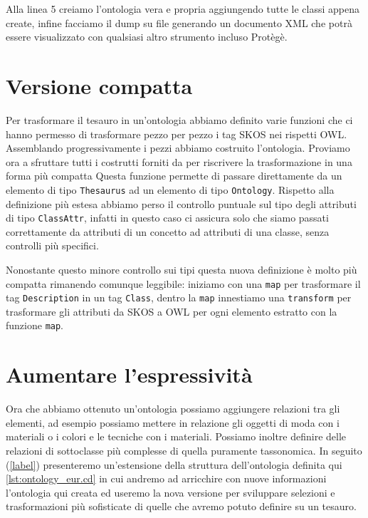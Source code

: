Alla linea 5 creiamo l'ontologia vera e propria aggiungendo tutte le classi appena create, infine facciamo il dump su file generando un documento XML che potrà essere visualizzato con qualsiasi altro strumento incluso Protègè.
\section{Versione compatta}
Per trasformare il tesauro in un'ontologia abbiamo definito varie funzioni che ci hanno permesso di trasformare pezzo per pezzo i tag SKOS nei rispetti OWL. Assemblando progressivamente i pezzi abbiamo costruito l'ontologia. Proviamo ora a sfruttare tutti i costrutti forniti da \cduce per riscrivere la trasformazione in una forma più compatta
Questa funzione permette di passare direttamente da un elemento di tipo \verb|Thesaurus| ad un elemento di tipo \verb|Ontology|. Rispetto alla definizione più estesa abbiamo perso il controllo puntuale sul tipo degli attributi di tipo \verb|ClassAttr|, infatti in questo caso \cduce ci assicura solo che siamo passati correttamente da attributi di un concetto ad attributi di una classe, senza controlli più specifici.

Nonostante questo minore controllo sui tipi questa nuova definizione è molto più compatta rimanendo comunque leggibile: iniziamo con una \verb|map| per trasformare il tag \verb|Description| in un tag \verb|Class|, dentro la \verb|map| innestiamo una \verb|transform| per trasformare gli attributi da SKOS a OWL per ogni elemento estratto con la funzione \verb|map|.

\section{Aumentare l'espressività}\label{expr}
Ora che abbiamo ottenuto un'ontologia possiamo aggiungere relazioni tra gli elementi, ad esempio possiamo mettere in relazione gli oggetti di moda con i materiali o i colori e le tecniche con i materiali. Possiamo inoltre definire delle relazioni di sottoclasse più complesse di quella puramente tassonomica.  In seguito (\ref{label}) presenteremo un'estensione della struttura dell'ontologia definita qui \ref{lst:ontology_eur.cd} in cui andremo ad arricchire con nuove informazioni l'ontologia qui creata ed useremo la nova versione per sviluppare selezioni e trasformazioni più sofisticate di quelle che avremo potuto definire su un tesauro.

